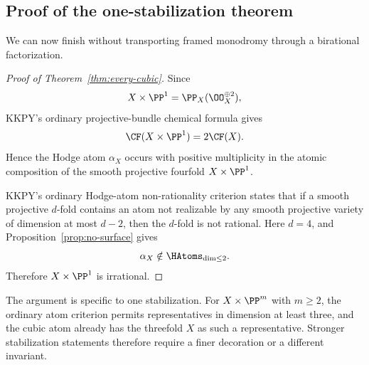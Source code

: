 \subsection{Proof of the one-stabilization theorem}

We can now finish without transporting framed monodromy through a birational
factorization.

\begin{proof}[Proof of Theorem~\ref{thm:every-cubic}]
Since
\[
  X\times\PP^1=\PP_X(\OO_X^{\oplus2}),
\]
KKPY's ordinary projective-bundle chemical formula gives
\begin{equation}\label{eq:product-CF}
  \CF(X\times\PP^1)=2\CF(X).
\end{equation}
Hence the Hodge atom \(\alpha_X\) occurs with positive multiplicity in the
atomic composition of the smooth projective fourfold \(X\times\PP^1\).

KKPY's ordinary Hodge-atom non-rationality criterion
\cite[Proposition~5.30]{KKPYY} states that if a smooth projective \(d\)-fold
contains an atom not realizable by any smooth projective variety of
dimension at most \(d-2\), then the \(d\)-fold is not rational.  Here
\(d=4\), and Proposition~\ref{prop:no-surface} gives
\[
  \alpha_X\notin\HAtoms_{\dim\le2}.
\]
Therefore \(X\times\PP^1\) is irrational.
%
%
%
\end{proof}

\begin{remark}
The argument is specific to one stabilization.  For \(X\times\PP^m\) with
\(m\ge2\), the ordinary atom criterion permits representatives in dimension
at least three, and the cubic atom already has the threefold \(X\) as such a
representative.  Stronger stabilization statements therefore require a
finer decoration or a different invariant.
\end{remark}
